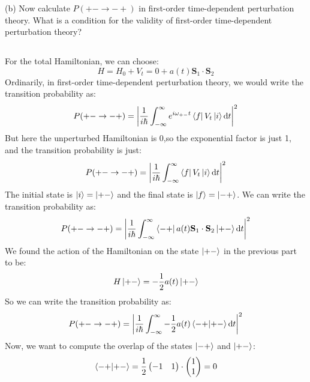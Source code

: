 \documentclass[12pt]{article}
\begin{document}
(b) Now calculate $P(+-\rightarrow-+)$ in first-order time-dependent perturbation theory. What is a condition for the validity of first-order time-dependent perturbation theory?
\subsection{}
For the total Hamiltonian, we can choose:
\begin{equation}
  H = H_0 + V_t = 0 + a(t) \mathbf{S}_1 \cdot \mathbf{S}_2
\end{equation}
Ordinarily, in first-order time-dependent perturbation theory, we would write the transition probability as:
\begin{equation}
  P(+-\rightarrow-+) = \abs{\frac{1}{i\hbar}\int_{-\infty}^{\infty} e^{i\omega_{+-}t}\bra{f}V_t\ket{i}\dd{t}}^2
\end{equation}
But here the unperturbed Hamiltonian is 0,so the exponential factor is just 1, and the transition probability is just:
\begin{equation}
  P(+-\rightarrow-+) = \abs{\frac{1}{i\hbar}\int_{-\infty}^{\infty} \bra{f}V_t\ket{i}\dd{t}}^2
\end{equation}
The initial state is $\ket{i} = \ket{+-}$ and the final state is $\ket{f} = \ket{-+}$. We can write the transition probability as:
\begin{equation}
  P(+-\rightarrow-+) = \abs{\frac{1}{i\hbar}\int_{-\infty}^{\infty} \bra{-+}a(t) \mathbf{S}_1 \cdot \mathbf{S}_2\ket{+-}\dd{t}}^2
\end{equation}
We found the action of the Hamiltonian on the state $\ket{+-}$ in the previous part to be:
\begin{equation}
  H\ket{+-} = -\frac{1}{2}a(t)\ket{+-}
\end{equation}
So we can write the transition probability as:
\begin{equation}
  P(+-\rightarrow-+) = \abs{\frac{1}{i\hbar}\int_{-\infty}^{\infty} -\frac{1}{2}a(t)\bra{-+}\ket{+-}\dd{t}}^2
\end{equation}
Now, we want to compute the overlap of the states $\ket{-+}$ and $\ket{+-}$:
\begin{equation}
  \bra{-+}\ket{+-} = \frac{1}{2}\begin{pmatrix} -1 & 1 \end{pmatrix}\cdot \begin{pmatrix} 1 \\ 1 \end{pmatrix} = 0
\end{equation}
\end{document}
